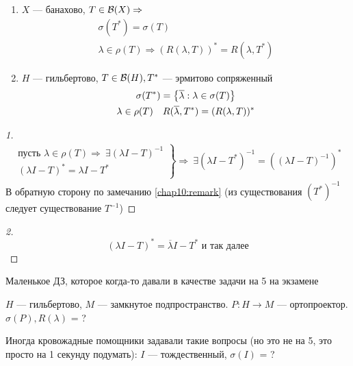 \documentclass[document]{subfiles}
\begin{document}
\begin{theorem}
    \begin{enumerate}
        \item $X$ --- банахово, $T \in \mathcal{B}(X) \Rightarrow$
            \begin{gather*}
                \sigma(T^*) = \sigma(T) \\
                \lambda \in \rho(T) \Rightarrow (R(\lambda, T))^* = R(\lambda, T^*)
            \end{gather*}
        \item $H$ --- гильбертово, $T \in \mathcal{B}(H), T^*$ --- эрмитово сопряженный 
            \begin{gather*}
                \sigma(T^*) = \left\{\overline{\lambda} : \lambda \in \sigma(T)\right\} \\
                \lambda \in \rho(T) \quad R(\overline{\lambda}, T^*) = (R(\lambda, T))^*
            \end{gather*}
    \end{enumerate}
\end{theorem}

\begin{proof}[1]
    \begin{gather*}
        \left. \begin{matrix}
            \text{пусть } \lambda \in \rho(T) \Rightarrow \: \exists (\lambda I - T)^{-1} \\
            (\lambda I - T)^* = \lambda I - T^*
        \end{matrix} \right\} \Rightarrow \: \exists (\lambda I - T^*)^{-1} = ((\lambda I - T)^{-1})^*
    \end{gather*}
    В обратную сторону по замечанию \ref{chap10:remark} (из существования $(T^*)^{-1}$ следует существование $T^{-1}$)
\end{proof}

\begin{proof}[2]
    \[ (\lambda I - T)^* = \overline{\lambda} I - T^* \text{ и так далее} \]
\end{proof}

Маленькое ДЗ, которое когда-то давали в качестве задачи на 5 на экзамене
\begin{statement}
    $H$  --- гильбертово, $M$ --- замкнутое подпространство. $P : H \rightarrow M$ --- ортопроектор. $\sigma(P), R(\lambda)$ = ?
\end{statement}

Иногда кровожадные помощники задавали такие вопросы (но это не на 5, это просто на 1 секунду подумать): $I$ --- тождественный, $\sigma(I)$ = ?
\end{document}
